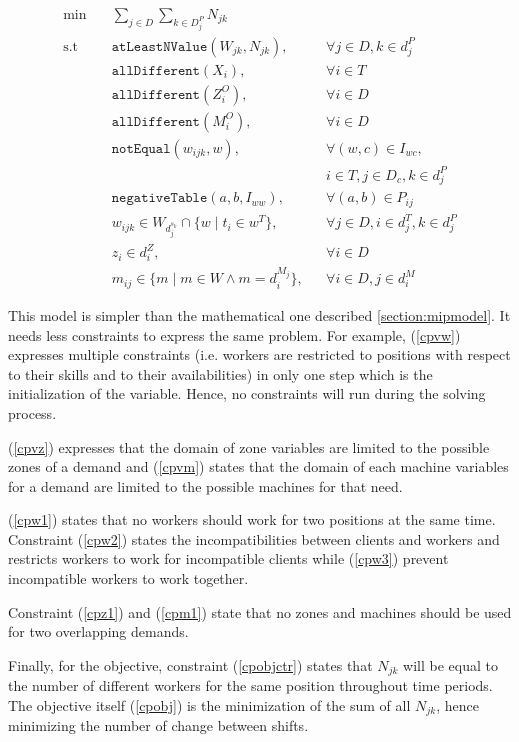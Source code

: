 \documentclass[../../thesis.tex]{subfiles}
\begin{document}
\begin{align}
  \textrm{min} \quad & \sum_{j \in D} \sum_{k \in D^P_j} N_{jk} & \label{cpobj} \\ 
  \textrm{s.t} \quad & \texttt{atLeastNValue}(W_{jk}, N_{jk}), && \forall j \in D, k \in d^P_j \label{cpobjctr} \\
                     & \texttt{allDifferent}(X_i), && \forall i \in T \label{cpw1} \\
                     & \texttt{allDifferent}(Z^O_i), && \forall i \in D \label{cpz1} \\
                     & \texttt{allDifferent}(M^O_i), && \forall i \in D \label{cpm1} \\ 
                     & \texttt{notEqual}(w_{ijk}, w), && \forall (w, c) \in I_{wc}, \label{cpw2} \\ 
                     & && i \in T, j \in D_c, k \in d^P_j \nonumber \\ 
                     & \texttt{negativeTable}(a, b, I_{ww}), && \forall (a, b) \in P_{ij} \label{cpw3} \\ 
                     & w_{ijk} \in W_{d^{s_k}_j} \cap \{ w \mid t_i \in w^T \}, && \forall j \in D, i \in d^T_j, k \in d^P_j \label{cpvw} \\ 
                     & z_{i} \in d_i^Z, && \forall i \in D \label{cpvz} \\ 
                     & m_{ij} \in \{ m \mid m \in W \land m = d^{M_j}_i \}, && \forall i \in D, j \in d^M_i \label{cpvm}
\end{align}


This model is simpler than the mathematical one described \autoref{section:mipmodel}. It 
needs less constraints to express the same problem. For example, (\ref{cpvw}) expresses multiple constraints (i.e. workers are restricted to positions with respect to their skills and to their availabilities)
in only one step which is the initialization of the variable. Hence, no constraints will run during the solving process.

(\ref{cpvz}) expresses that the domain of zone variables are limited to the possible zones of a demand and (\ref{cpvm}) states that 
the domain of each machine variables for a demand are limited to the possible machines for that need.

(\ref{cpw1}) states that no workers should work for two positions at the same time. Constraint (\ref{cpw2}) states
the incompatibilities between clients and workers and restricts workers to work for incompatible clients while 
(\ref{cpw3}) prevent incompatible workers to work together.

Constraint (\ref{cpz1}) and (\ref{cpm1}) state that no zones and machines should be used for two overlapping demands.

Finally, for the objective, constraint (\ref{cpobjctr}) states that $N_{jk}$ will be equal to the number of different workers for the same position 
throughout time periods. The objective itself (\ref{cpobj}) is the minimization of the sum of all $N_{jk}$, hence minimizing the number of change between 
shifts.
\end{document}
